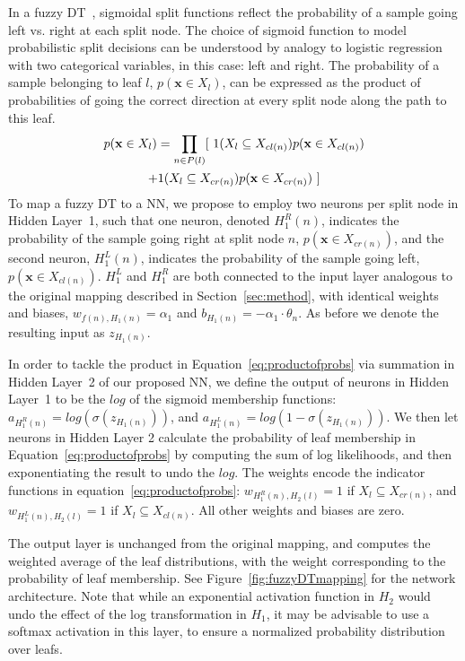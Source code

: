 \documentclass[twocolumn]{svjour3}
\begin{document}
In a fuzzy DT~\cite{SuarezL99}, 
sigmoidal split functions reflect the probability of a sample going left vs. right at each split node. %
The choice of sigmoid function to model probabilistic split decisions can be understood by analogy to logistic regression with two categorical variables, in this case: left and right.
%
The probability of a sample belonging to leaf $l$, $p(\mathbf{x} \in X_l)$, can be expressed as the product of probabilities of going the correct direction at every split node along the path to this leaf.
%
\begin{multline}
	p(\mathbf{x} \in X_l) = \prod_{n \in P(l)} 
	[\ \textnormal{1}(X_l \subseteq X_{cl(n)})p(\mathbf{x} \in X_{cl(n)}) \\
	+ \textnormal{1}(X_l \subseteq X_{cr(n)})p(\mathbf{x} \in X_{cr(n)})\ ]
\label{eq:productofprobs}
\end{multline}
%
To map a fuzzy DT to a NN, we propose to employ two neurons per split node in Hidden Layer~1, such that one neuron, denoted $H^R_1(n)$, indicates the probability of the sample going right at split node $n$, $p(\mathbf{x} \in X_{cr(n)})$,
and the second neuron, $H^L_1(n)$, indicates the probability of the sample going left,
$p(\mathbf{x} \in X_{cl(n)})$. 
%
$H^L_1$ and $H^R_1$ are both connected to the input layer analogous to the original mapping described in Section~\ref{sec:method}, with identical weights and biases, $w_{{f(n)},H_1(n)} = \alpha_1$ and $b_{H_1(n)} = -\alpha_1 \cdot \theta_n$. As before we denote the resulting input as $z_{H_1(n)}$. 

In order to tackle the product in Equation~\ref{eq:productofprobs} via summation in Hidden Layer~2 of our proposed NN, we define the output of neurons in Hidden Layer~1 to be the $log$ of the sigmoid membership functions: 
%
$a_{H^R_1(n)}=log(\sigma(z_{H_1(n)}))$, and $a_{H^L_1(n)}=log(1-\sigma(z_{H_1(n)}))$.
%
We then let neurons in Hidden Layer 2 calculate the probability of leaf membership in Equation~\ref{eq:productofprobs} by computing the sum of log likelihoods, and then exponentiating the result to undo the $log$. 
The weights encode the indicator functions in equation~\ref{eq:productofprobs}: $w_{H^R_1(n),H_2(l)} = 1$ if $X_l \subseteq X_{cr(n)}$, and $w_{H^L_1(n),H_2(l)} = 1$ if $X_l \subseteq X_{cl(n)}$.
%
All other weights and biases are zero.

The output layer is unchanged from the original mapping, and computes the weighted average of the leaf distributions, with the weight corresponding to the probability of leaf membership.  
See Figure~\ref{fig:fuzzyDTmapping} for the network architecture.
Note that while an exponential activation function in $H_2$ would undo the effect of the log transformation in $H_1$, it may be advisable to use a softmax activation in this layer, to ensure a normalized probability distribution over leafs.
\end{document}
